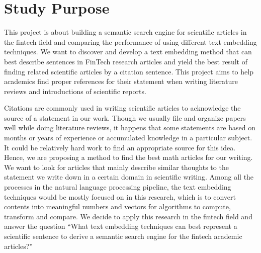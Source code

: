 \section{Study Purpose}
This project is about building a semantic search engine for scientific articles in the fintech field and comparing the performance of using different text embedding techniques.
We want to discover and develop a text embedding method that can best describe sentences in FinTech research articles and yield the best result of finding related scientific articles by a citation sentence.
This project aims to help academics find proper references for their statement when writing literature reviews and introductions of scientific reports.

Citations are commonly used in writing scientific articles to acknowledge the source of a statement in our work.
Though we usually file and organize papers well while doing literature reviews, it happens that some statements are based on months or years of experience or accumulated knowledge in a particular subject.
It could be relatively hard work to find an appropriate source for this idea.
Hence, we are proposing a method to find the best math articles for our writing.
We want to look for articles that mainly describe similar thoughts to the statement we write down in a certain domain in scientific writing.
Among all the processes in the natural language processing pipeline, the text embedding techniques would be mostly focused on in this research, which is to convert contents into meaningful numbers and vectors for algorithms to compute, transform and compare.
We decide to apply this research in the fintech field and answer the question “What text embedding techniques can best represent a scientific sentence to derive a semantic search engine for the fintech academic articles?”